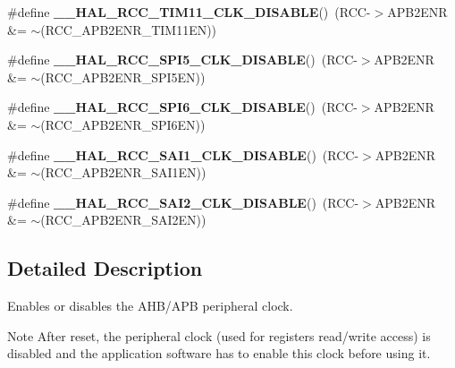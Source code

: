 \begin{DoxyCompactItemize}
\#define {\bfseries \+\_\+\+\_\+\+H\+A\+L\+\_\+\+R\+C\+C\+\_\+\+T\+I\+M11\+\_\+\+C\+L\+K\+\_\+\+D\+I\+S\+A\+B\+LE}()~(R\+CC-\/$>$A\+P\+B2\+E\+NR \&= $\sim$(R\+C\+C\+\_\+\+A\+P\+B2\+E\+N\+R\+\_\+\+T\+I\+M11\+EN))
\item 
\mbox{\label{group___r_c_c_ex___peripheral___clock___enable___disable_ga68c2a52fef447801cb641586a57d15e5}} 
\#define {\bfseries \+\_\+\+\_\+\+H\+A\+L\+\_\+\+R\+C\+C\+\_\+\+S\+P\+I5\+\_\+\+C\+L\+K\+\_\+\+D\+I\+S\+A\+B\+LE}()~(R\+CC-\/$>$A\+P\+B2\+E\+NR \&= $\sim$(R\+C\+C\+\_\+\+A\+P\+B2\+E\+N\+R\+\_\+\+S\+P\+I5\+EN))
\item 
\mbox{\label{group___r_c_c_ex___peripheral___clock___enable___disable_gabab1133742baef14e8d76e1b6cba9926}} 
\#define {\bfseries \+\_\+\+\_\+\+H\+A\+L\+\_\+\+R\+C\+C\+\_\+\+S\+P\+I6\+\_\+\+C\+L\+K\+\_\+\+D\+I\+S\+A\+B\+LE}()~(R\+CC-\/$>$A\+P\+B2\+E\+NR \&= $\sim$(R\+C\+C\+\_\+\+A\+P\+B2\+E\+N\+R\+\_\+\+S\+P\+I6\+EN))
\item 
\mbox{\label{group___r_c_c_ex___peripheral___clock___enable___disable_ga1f8e5c20350d611721053981830bbb12}} 
\#define {\bfseries \+\_\+\+\_\+\+H\+A\+L\+\_\+\+R\+C\+C\+\_\+\+S\+A\+I1\+\_\+\+C\+L\+K\+\_\+\+D\+I\+S\+A\+B\+LE}()~(R\+CC-\/$>$A\+P\+B2\+E\+NR \&= $\sim$(R\+C\+C\+\_\+\+A\+P\+B2\+E\+N\+R\+\_\+\+S\+A\+I1\+EN))
\item 
\mbox{\label{group___r_c_c_ex___peripheral___clock___enable___disable_ga86941cfe8c189143837806bd4f486da5}} 
\#define {\bfseries \+\_\+\+\_\+\+H\+A\+L\+\_\+\+R\+C\+C\+\_\+\+S\+A\+I2\+\_\+\+C\+L\+K\+\_\+\+D\+I\+S\+A\+B\+LE}()~(R\+CC-\/$>$A\+P\+B2\+E\+NR \&= $\sim$(R\+C\+C\+\_\+\+A\+P\+B2\+E\+N\+R\+\_\+\+S\+A\+I2\+EN))
\end{DoxyCompactItemize}


\subsection{Detailed Description}
Enables or disables the A\+H\+B/\+A\+PB peripheral clock. 

\begin{DoxyNote}{Note}
After reset, the peripheral clock (used for registers read/write access) is disabled and the application software has to enable this clock before using it. 
\end{DoxyNote}


